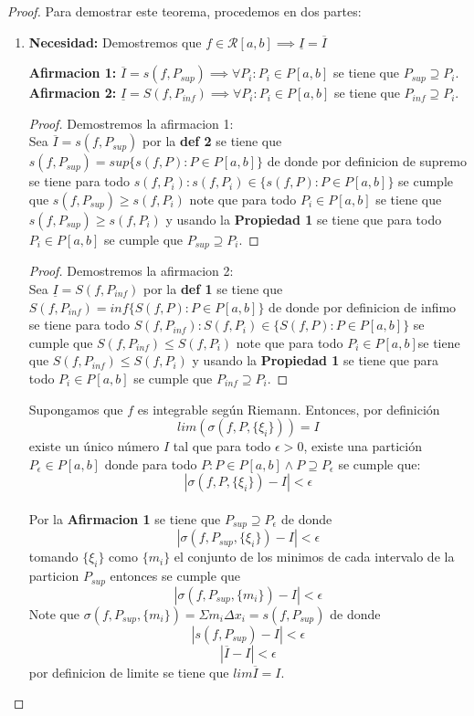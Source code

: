 \documentclass{article}
\begin{document}
\begin{proof}
Para demostrar este teorema, procedemos en dos partes:
\begin{enumerate}
    \item \textbf{Necesidad:} 
Demostremos que  \(f \in \mathcal{R}[a, b] \implies \underline{I} = \overline{I} \)

    \textbf{Afirmacion 1:} \(\overline{I} = s(f, P_{sup}) \implies \forall  P_i: P_i \in P[a,b]\) se tiene que \(P_{sup} \supseteq P_i\).\\
    \textbf{Afirmacion 2:} \(\underline{I} = S(f, P_{inf}) \implies \forall  P_i: P_i \in P[a,b]\) se tiene que \(P_{inf} \supseteq P_i\).
\begin{proof}
Demostremos la afirmacion 1:\\

Sea \(\overline{I} = s(f, P_{sup})\) por la \textbf{def 2} se tiene que \(s(f, P_{sup}) = sup\{ s(f, P): P \in P[a, b] \}\) de donde por definicion de supremo se tiene para todo \(  s(f, P_i): s(f, P_i) \in \{ s(f, P): P \in P[a, b] \}\)  se cumple que \(s(f, P_{sup}) \geq s(f, P_i)\) note que para todo \(P_i \in P[a,b]\) se tiene que \(s(f, P_{sup}) \geq s(f, P_i)\) y usando la \textbf{Propiedad 1} se tiene que para todo \(P_i \in P[a,b]\) se cumple que \( P_{sup} \supseteq P_i\).
\end{proof}

\begin{proof}
Demostremos la afirmacion 2:\\

Sea \(\underline{I} = S(f, P_{inf})\) por la \textbf{def 1} se tiene que \(S(f, P_{inf}) = inf\{ S(f, P): P \in P[a, b] \}\) de donde por definicion de infimo se tiene para todo \(  S(f, P_{inf}): S(f, P_i) \in \{ S(f, P): P \in P[a, b] \}\)  se cumple que \(S(f, P_{inf}) \leq S(f, P_i)\) note que para todo \(P_i \in P[a,b]\)se tiene que \(S(f, P_{inf}) \leq S(f, P_i)\) y usando la \textbf{Propiedad 1} se tiene que para todo \(P_i \in P[a,b]\) se cumple que \( P_{inf} \supseteq P_i\).
\end{proof}

 Supongamos que \( f \) es integrable según Riemann. Entonces, por definición
\[
lim(\sigma(f, P,\{\xi_i\})) = I
\]
existe un único número \( I \) tal que para todo \( \epsilon > 0 \), existe una partición \( P_\epsilon \in P[a, b]\)  donde para todo \( P: P \in P[a, b] \wedge P \supseteq P_\epsilon\) se cumple que:
    \[
    |\sigma(f, P,\{\xi_i\}) - I| < \epsilon
    \]\\
Por la \textbf{Afirmacion 1} se tiene que \(P_{sup} \supseteq P_\epsilon\) de donde 
\[
|\sigma(f, P_{sup},\{\xi_i\}) - I| < \epsilon
\]
tomando \(\{\xi_i\}\) como \(\{m_i\}\) el conjunto de los minimos de cada intervalo de la particion \(P_{sup}\) entonces se cumple que
\[
|\sigma(f, P_{sup},\{m_i\}) - I| < \epsilon
\]
Note que \(\sigma(f, P_{sup},\{m_i\}) = \Sigma m_i\Delta x_i = s(f, P_{sup})\) de donde
\[
|s(f, P_{sup}) - I| < \epsilon
\]
\[
|\overline{I} - I| < \epsilon
\]
por definicion de limite se tiene que \(lim\overline{I} = I\).\\


\end{enumerate}
\end{proof}
\end{document}
